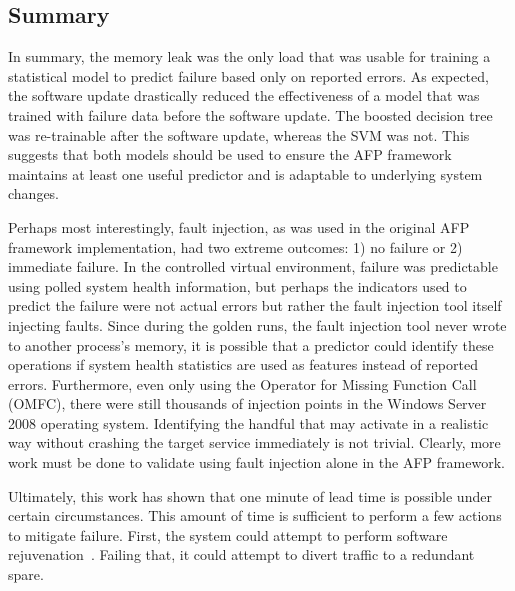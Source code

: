 \subsection{Summary}
In summary, the memory leak was the only load that was usable for training a
statistical model to predict failure based only on reported errors.  As
expected, the software update drastically reduced the effectiveness of a model
that was trained with failure data before the software update.  The boosted
decision tree was re-trainable after the software update, whereas the \ac{SVM}
was not.  This suggests that both models should be used to ensure the \ac{AFP}
framework maintains at least one useful predictor and is adaptable to
underlying system changes.

Perhaps most interestingly, fault injection, as was used in the original
\ac{AFP} framework implementation, had two extreme outcomes: 1) no failure or
2) immediate failure.  In the controlled virtual environment, failure was
predictable using polled system health information, but perhaps the indicators
used to predict the failure were not actual errors but rather the fault
injection tool itself injecting faults.  Since during the golden runs, the
fault injection tool never wrote to another process’s memory, it is possible
that a predictor could identify these operations if system health statistics
are used as features instead of reported errors.  Furthermore, even only using
the Operator for Missing Function Call (OMFC), there were still thousands of
injection points in the Windows Server 2008 operating system.  Identifying the
handful that may activate in a realistic way without crashing the target
service immediately is not trivial.  Clearly, more work must be done to
validate using fault injection alone in the \ac{AFP} framework.

Ultimately, this work has shown that one minute of lead time is possible under
certain circumstances.  This amount of time is sufficient to perform a few
actions to mitigate failure.  First, the system could attempt to perform
software rejuvenation~\citep{candea2004microreboot}.  Failing that, it could
attempt to divert traffic to a redundant spare.
